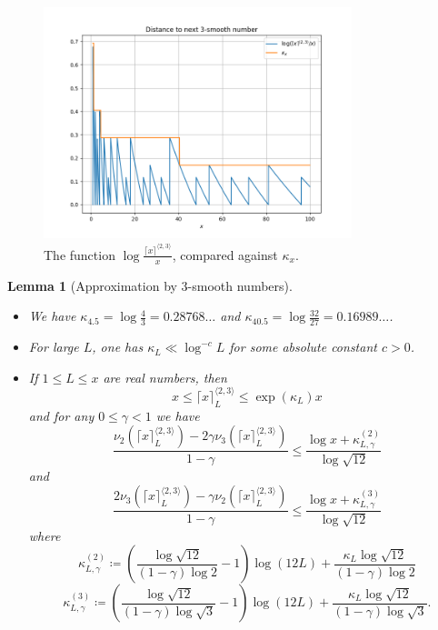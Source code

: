 \documentclass[12pt,a4paper,reqno]{amsart}
\numberwithin{equation}{section}
\theoremstyle{plain}
\newtheorem{lemma}[theorem]{Lemma}
\theoremstyle{definition}
\begin{document}
\begin{figure}
  \centering
  \includegraphics[width=0.8\textwidth]{next_smooth.png}
  \caption{The function $\log \frac{\lceil x \rceil^{\langle 2,3 \rangle}}{x}$, compared against $\kappa_x$. 
  }\label{fig:nextsmooth}
  \end{figure}


\begin{lemma}[Approximation by $3$-smooth numbers]\label{power-lemma}\ 
\begin{itemize}
\item[(i)]  We have $\kappa_{4.5} = \log\frac{4}{3} = 0.28768\dots$ and $\kappa_{40.5} = \log \frac{32}{27} = 0.16989\dots$.
\item[(ii)]  For large $L$, one has $\kappa_L \ll \log^{-c} L$ for some absolute constant $c>0$.
\item[(iii)]  If $1 \leq L \leq x$ are real numbers, then
\begin{equation}\label{mod-kappa}
  x \leq \lceil x \rceil^{\langle 2,3\rangle}_L \leq \exp(\kappa_L) x 
\end{equation}
and for any $0 \leq \gamma < 1$ we have
\begin{equation}\label{12-2}
\frac{\nu_2(\lceil x \rceil^{\langle 2,3\rangle}_L) - 2 \gamma \nu_3(\lceil x \rceil^{\langle 2,3\rangle}_L)}{1-\gamma} \leq \frac{\log x  + \kappa^{(2)}_{L,\gamma} }{\log \sqrt{12}} 
\end{equation}
and
\begin{equation}\label{12-3}
\frac{2\nu_3(\lceil x \rceil^{\langle 2,3\rangle}_L) - \gamma \nu_2(\lceil x \rceil^{\langle 2,3\rangle}_L)}{1-\gamma} \leq \frac{\log x + \kappa^{(3)}_{L,\gamma} }{\log \sqrt{12}} 
\end{equation}
where
\begin{equation}\label{kappastar-2-def}
\kappa^{(2)}_{L,\gamma} \coloneqq \left(\frac{\log \sqrt{12}}{(1-\gamma)\log 2} - 1\right) \log(12L) + \frac{\kappa_L\log \sqrt{12}}{(1-\gamma) \log 2}
\end{equation}
\begin{equation}\label{kappastar-3-def}
  \kappa^{(3)}_{L,\gamma} \coloneqq \left(\frac{\log \sqrt{12}}{(1-\gamma)\log \sqrt{3}} - 1\right) \log(12L) + \frac{\kappa_L\log \sqrt{12}}{(1-\gamma)\log \sqrt{3}}.
\end{equation}
\end{itemize}
\end{lemma}
\end{document}
